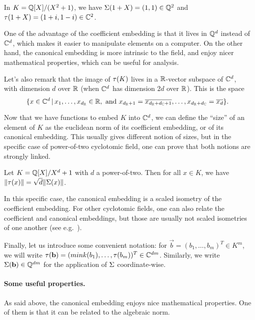 \begin{example}
In $K = \mathbb{Q}[X]/(X^2+1)$, we have $\Sigma(1+X) = (1,1) \in \mathbb{Q}^2$ and $\tau(1+X) = (1+i, 1-i) \in \mathbb{C}^2$.
\end{example}

One of the advantage of the coefficient embedding is that it lives in $\mathbb{Q}^d$ instead of $\mathbb{C}^d$, which makes it easier to manipulate elements on a computer. On the other hand, the canonical embedding is more intrinsic to the field, and enjoy nicer mathematical properties, which can be useful for analysis.

Let's also remark that the image of $\tau(K)$ lives in a $\mathbb{R}$-vector subspace of $\mathbb{C}^d$, with dimension $d$ over $\mathbb{R}$ (when $\mathbb{C}^d$ has dimension $2d$ over $\mathbb{R}$). This is the space
\[\{x \in \mathbb{C}^d \,|\, x_1, \dots, x_{d_{\mathbb{R}}} \in \mathbb{R}, \text{ and } x_{d_{\mathbb{R}}+1} = \overline{x_{d_{\mathbb{R}}+d_{\mathbb{C}}+1}}, \dots, x_{d_{\mathbb{R}}+d_{\mathbb{C}}} = \overline{x_d} \}.\]

Now that we have functions to embed $K$ into $\mathbb{C}^d$, we can define the ``size'' of an element of $K$ as the euclidean norm of its coefficient embedding, or of its canonical embedding. This usually gives different notion of sizes, but in the specific case of power-of-two cyclotomic field, one can prove that both notions are strongly linked.

\begin{proposition}
Let $K = \mathbb{Q}[X]/X^d+1$ with $d$ a power-of-two. Then for all $x \in K$, we have $\|\tau(x)\| = \sqrt{d} \|\Sigma(x)\|$.
\end{proposition}
In this specific case, the canonical embedding is a scaled isometry of the coefficient embedding. For other cyclotomic fields, one can also relate the coefficient and canonical embeddings, but those are usually not scaled isometries of one another (see e.g.~\cite{Blanco}).

Finally, let us introduce some convenient notation: for $\vec b = (b_1, \dots, b_m)^T \in K^m$, we will write $\tau(\mathbf b) = (mink(b_1), \dots, \tau(b_m))^T \in \mathbb{C}^{dm}$. Similarly, we write $\Sigma(\mathbf b) \in \mathbb{Q}^{dm}$ for the application of $\Sigma$ coordinate-wise.

\paragraph{Some useful properties.} As said above, the canonical embedding enjoys nice mathematical properties. One of them is that it can be related to the algebraic norm.

